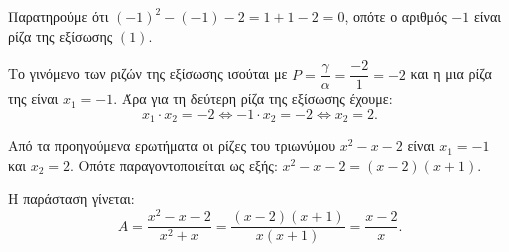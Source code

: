 
\begin{alist}
\item Παρατηρούμε ότι $(-1)^2 - (-1) - 2 = 1 + 1 - 2 = 0$, οπότε ο αριθμός $-1$ είναι ρίζα της
εξίσωσης $(1)$.

\item Το γινόμενο των ριζών της εξίσωσης ισούται με $P = \dfrac{\gamma}{\alpha} = \dfrac{-2}{1} = -2$ και η μια ρίζα της είναι
$x_1 = -1$. Άρα για τη δεύτερη ρίζα της εξίσωσης έχουμε:
\[x_1 \cdot x_2 = -2 \Leftrightarrow -1 \cdot x_2 = -2 \Leftrightarrow x_2 = 2.\]

\item Από τα προηγούμενα ερωτήματα οι ρίζες του τριωνύμου $x^2 - x - 2$ είναι $x_1 = -1$ και
$x_2 = 2$. Οπότε παραγοντοποιείται ως εξής:
$x^2 - x - 2 = (x - 2)(x + 1)$.

Η παράσταση γίνεται:
\[A = \dfrac{x^2 - x - 2}{x^2 + x} = \dfrac{(x - 2)(x + 1)}{x(x + 1)} = \dfrac{x - 2}{x}.\]
\end{alist}

